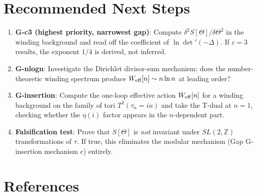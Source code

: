 \documentclass[12pt,a4paper]{article}
\theoremstyle{definition}
\theoremstyle{remark}
\newcommand{\ZZ}{\mathbb{Z}}
\begin{document}
\section{Recommended Next Steps}
\label{sec:eta:nextsteps}

\begin{enumerate}
  \item \textbf{G-c3 (highest priority, narrowest gap)}:
        Compute $\delta^2 S[\Theta]/\delta\Theta^2$ in the winding background
        and read off the coefficient of $\ln\det'(-\Delta)$.  If $c = 3$
        results, the exponent $1/4$ is derived, not inferred.

  \item \textbf{G-nlogn}:
        Investigate the Dirichlet divisor-sum mechanism: does the
        number-theoretic winding spectrum produce
        $W_{\rm eff}[n] \sim n\ln n$ at leading order?

  \item \textbf{G-insertion}:
        Compute the one-loop effective action $W_{\rm eff}[n]$ for a winding
        background on the family of tori $T^2(\tau_n = in)$ and take the
        T-dual at $n = 1$, checking whether the $\eta(i)$ factor appears
        in the $n$-dependent part.

  \item \textbf{Falsification test}:
        Prove that $S[\Theta]$ is \emph{not} invariant under
        $SL(2,\ZZ)$ transformations of $\tau$.  If true, this eliminates
        the modular mechanism (Gap G-insertion mechanism c) entirely.
\end{enumerate}

\section{References}
\label{sec:eta:refs}
\end{document}
